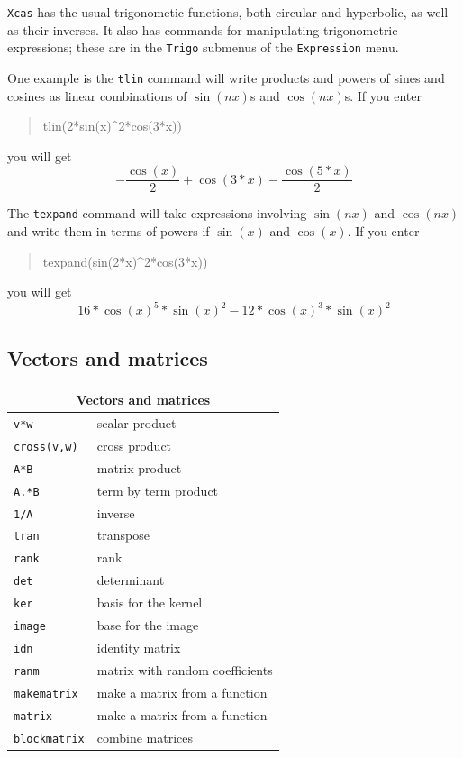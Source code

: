 \documentclass{article}
\newcommand{\xcasin}[1]
{\begin{quote}\ttfamily
#1
\end{quote}}
\newcommand{\xcasout}[1]
{\begin{equation*}
#1
\end{equation*}}
\begin{document}
\texttt{Xcas} has the usual trigonometic functions, both circular and
hyperbolic, as well as their inverses.  It also has commands for
manipulating trigonometric expressions; these are in the
\texttt{Trigo} submenus of the \texttt{Expression} menu.

One example is the \texttt{tlin} command will write products and powers of sines and
cosines as linear combinations of $\sin(n x)$s and $\cos(n x)$s.  If
you enter
\xcasin{tlin(2*sin(x)\^{}2*cos(3*x))}
you will get
\xcasout{-\frac{\cos(x)}{2} + \cos(3*x) - \frac{\cos(5*x)}{2}}

The \texttt{texpand} command will take expressions involving 
$\sin(n x)$ and $\cos(n x)$ and write them in terms of powers if
$\sin(x)$ and $\cos(x)$.  If you enter
\xcasin{texpand(sin(2*x)\^{}2*cos(3*x))}
you will get
\xcasout{16*\cos(x)^5*\sin(x)^2-12*\cos(x)^3*\sin(x)^2}


\subsection{Vectors and matrices}

\begin{center}
\begin{tabular}{|p{}|p{}|}
\hline
\multicolumn{2}{|c|}{\bf Vectors and matrices}\\
\hline\hline
\texttt{v*w} & scalar product\\
\texttt{cross(v,w)} & cross product\\
\texttt{A*B} & matrix product\\
\texttt{A.*B} & term by term product\\
\texttt{1/A} & inverse\\
\texttt{tran}& transpose\\
\texttt{rank} & rank\\
\texttt{det} & determinant\\
\texttt{ker} & basis for the kernel\\
\texttt{image} & base for the image\\
\texttt{idn} & identity matrix\\
\texttt{ranm} & matrix with random coefficients\\
\texttt{makematrix} & make a matrix from a function\\
\texttt{matrix} & make a matrix from a function\\
\texttt{blockmatrix} & combine matrices\\
\hline
\end{tabular}
\end{center}
\end{document}
